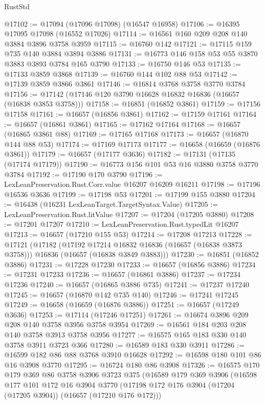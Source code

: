 \begin{lexlean}{RustStd}
\begin{coremodule}
@17102 := @17094 (@17096 @17098) (@16547 @16958)
@17106 := @16395 @17095 @17098 (@16552 @17026)
@17114 := @16561 @160 @209 @208 @140 @3884 @3896 @3758 @3959
@17115 := @16760 @142
@17121 := @17115 @159 @735 @140 @3884 @3894 @3886
@17131 := @16773 @146 @158 @53 @55 @3870 @3883 @3893 @3784 @165 @3790
@17133 := @16750 @146 @53
@17135 := @17133 @3859 @3868
@17139 := @16760 @144 @102 @88 @53
@17142 := @17139 @3859 @3866 @3861
@17146 := @16814 @3768 @3758 @3770 @3784
@17156 := @17142 (@17146 @120 @3790 @16628 @16832 @16836 (@16657 (@16838 @3853 @3758)))
@17158 := @16851 (@16852 @3861)
@17159 := @17156 @17158
@17161 := @16657 (@16856 @3861)
@17162 := @17159 @17161
@17164 := @16657 (@16861 @3861)
@17165 := @17162 @17164
@17168 := @16657 (@16865 @3861 @88)
@17169 := @17165 @17168
@17173 := @16657 (@16870 @144 @88 @53)
@17174 := @17169 @17173
@17177 := @16658 (@16659 (@16876 @3861))
@17179 := @16657 (@17177 @3636)
@17182 := @17131 (@17135 (@17174 @17179))
@17190 := @16773 @156 @101 @53 @16 @3880 @3758 @3770 @3784
@17192 := @17190 @170 @3790
@17196 := LexLeanPreservation.Rust.Corr.value @16207 @16209 @16211
@17198 := @17196 @16536 @3636
@17199 := @17198 @53
@17201 := @17199 @155 @3880
@17204 := @16438 (@16231 LexLeanTarget.TargetSyntax.Value)
@17205 := LexLeanPreservation.Rust.litValue
@17207 := @17204 (@17205 @3880)
@17208 := @17201 @17207
@17210 := LexLeanPreservation.Rust.typedLit @16207
@17213 := @16657 (@17210 @155 @53)
@17214 := @17208 @17213
@17228 := @17121
    (@17182
      (@17192 @17214 @16832 @16836 (@16657 (@16838 @3873 @3758)))
      @16836
      (@16657 (@16838 @3849 @3883)))
@17230 := @16851 (@16852 @3886)
@17231 := @17228 @17230
@17233 := @16657 (@16856 @3886)
@17234 := @17231 @17233
@17236 := @16657 (@16861 @3886)
@17237 := @17234 @17236
@17240 := @16657 (@16865 @3886 @735)
@17241 := @17237 @17240
@17245 := @16657 (@16870 @142 @735 @140)
@17246 := @17241 @17245
@17249 := @16658 (@16659 (@16876 @3886))
@17251 := @16657 (@17249 @3636)
@17253 := @17114 (@17246 @17251)
@17261 := @16674 @3896 @209 @208 @140 @3758 @3956 @3758 @3954
@17269 := @16561 @184 @203 @208 @140 @3758 @3913 @3758 @3956
@17277 := @16575 @165 @183 @330 @140 @3758 @3911 @3723 @366
@17280 := @16589 @183 @330 @3911
@17286 := @16599 @182 @86 @88 @3768 @3910 @16628
@17292 := @16598 @180 @101 @86 @16 @3908 @3770
@17295 := @16724 @180 @86 @3908
@17326 := @16575
    @170
    @179
    @369
    @86
    @3758
    @3906
    @3723
    @375
    (@16589
      @179
      @369
      @3906
      (@16598
        @177
        @101
        @172
        @16
        @3904
        @3770
        (@17198 @172 @176 @3904 (@17204 (@17205 @3904)) (@16657 (@17210 @176 @172)))

\end{coremodule}
\end{lexlean}
